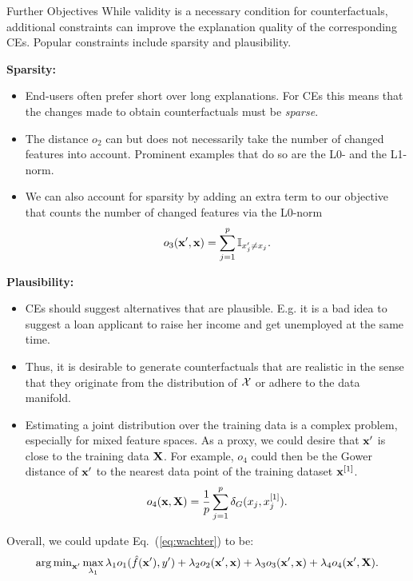 \documentclass[11pt,compress,t,notes=noshow, xcolor=table]{beamer}
\begin{document}
\begin{vbframe}{Further Objectives}
	While validity is a necessary condition for counterfactuals, additional constraints can improve the explanation quality of the corresponding CEs. Popular constraints include sparsity and plausibility.
	
	\textbf{Sparsity:}
	\begin{itemize}
		\item End-users often prefer short over long explanations. For CEs this means that the changes made to obtain counterfactuals must be \emph{sparse}. 
		\item The distance $o_2$ can but does not necessarily take the number of changed features into account. Prominent examples that do so are the L0- and the L1-norm.
        \item We can also account for sparsity by adding an extra term to our objective that counts the number of changed features via the L0-norm $$o_3(\xv', \xv) = \sum_{j = 1}^p \mathbb{I}_{x'_j \neq x_j}.$$ 
	\end{itemize}
	\framebreak
	\textbf{Plausibility:}
	\begin{itemize}
	    \item CEs should suggest alternatives that are plausible. E.g. it is a bad idea to suggest a loan applicant to raise her income and get unemployed at the same time. 
	    \item Thus, it is desirable to generate counterfactuals that are realistic in the sense that they originate from the distribution of $\Xspace$ or adhere to the data manifold. 
		\item Estimating a joint distribution over the training data is a complex problem, especially for mixed feature spaces. As a proxy, we could desire that $\xv'$ is close to the training data $\Xmat$. For example, $o_4$ could then be the Gower distance of $\xv'$ to the nearest data point of the training dataset $\xv^{[1]}$. 
		$$o_4(\xv, \Xmat) =  \frac{1}{p} \sum_{j = 1}^{p}  \delta_G(x_j, x^{[1]}_j).$$
	\end{itemize}	
	Overall, we could update Eq.~(\ref{eq:wachter}) to be: 
	\begin{equation}
		\argmin_{\xv'} \max_{\lambda_1} \lambda_1 o_1(\fh(\xv'), y') + \lambda_2 o_2(\xv', \xv) + \lambda_3 o_3(\xv', \xv) + \lambda_4 o_4(\xv', \Xmat).
	\end{equation}
	

\end{vbframe}
\end{document}
